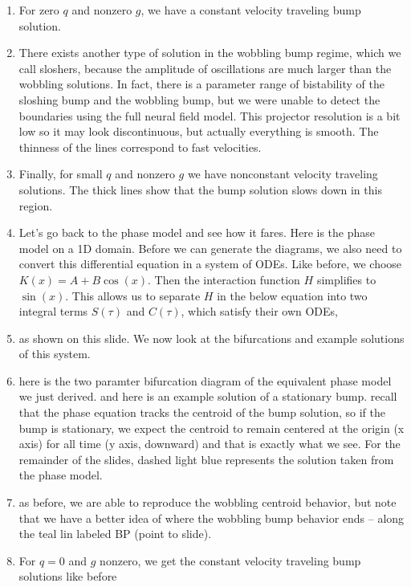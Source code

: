 \documentclass[a4paper,14pt]{article}
\begin{document}
\begin{enumerate}
 \item For zero $q$ and nonzero $g$, we have a constant velocity traveling bump solution.
 
 \item There exists another type of solution in the wobbling bump regime, which we call sloshers, because the amplitude of oscillations are much larger than the wobbling solutions. In fact, there is a parameter range of bistability of the sloshing bump and the wobbling bump, but we were unable to detect the boundaries using the full neural field model. This projector resolution is a bit low so it may look discontinuous, but actually everything is smooth. The thinness of the lines correspond to fast velocities.
 
 \item Finally, for small $q$ and nonzero $g$ we have nonconstant velocity traveling solutions. The thick lines show that the bump solution slows down in this region.
 
 \item Let's go back to the phase model and see how it fares. Here is the phase model on a 1D domain. Before we can generate the diagrams, we also need to convert this differential equation in a system of ODEs. Like before, we choose $K(x) = A + B\cos(x)$. Then the interaction function $H$ simplifies to $\sin(x)$. This allows us to separate $H$ in the below equation into two integral terms $S(\tau)$ and $C(\tau)$, which satisfy their own ODEs,
 
 \item as shown on this slide. We now look at the bifurcations and example solutions of this system.
 
 \item here is the two paramter bifurcation diagram of the equivalent phase model we just derived. and here is an example solution of a stationary bump. recall that the phase equation tracks the centroid of the bump solution, so if the bump is stationary, we expect the centroid to remain centered at the origin (x axis) for all time (y axis, downward) and that is exactly what we see. For the remainder of the slides, dashed light blue represents the solution taken from the phase model.
 
 \item as before, we are able to reproduce the wobbling centroid behavior, but note that we have a better idea of where the wobbling bump behavior ends -- along the teal lin labeled BP (point to slide).
 
 \item For $q=0$ and $g$ nonzero, we get the constant velocity traveling bump solutions like before
 

\end{enumerate}
\end{document}
